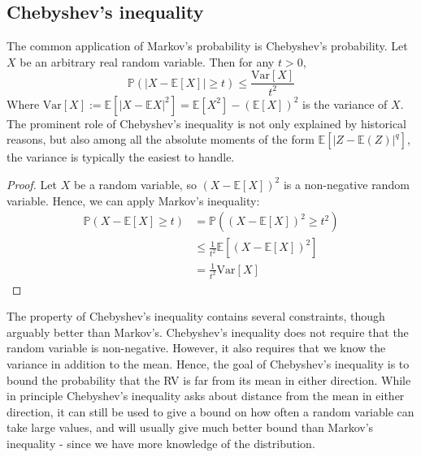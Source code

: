 \subsection{Chebyshev's inequality}
The common application of Markov's probability is Chebyshev's probability. Let $X$ be an arbitrary real random variable. Then for any $t> 0$, 
\begin{equation}
    \mathbb{P}(|X-\mathbb{E}[X]| \geq t) \leq \frac{\mathrm{Var}[X]}{t^{2}} 
\end{equation}
Where $\mathrm{Var}[X]:= \mathbb{E}[|X-\mathbb{E}X|^{2}]=\mathbb{E}[X^{2}]- (\mathbb{E}[X])^{2}$ is the variance of $X$. The prominent role of Chebyshev's inequality is not only explained by historical reasons, but also among all the absolute moments of the form $\mathbb{E}[|Z-\mathbb{E}(Z)|^{q}]$, the variance is typically the easiest to handle. 
\begin{proof}
    Let $X$ be a random variable, so $(X-\mathbb{E}[X])^{2}$ is a non-negative random variable. Hence, we can apply Markov's inequality: 
    \begin{align}
        \mathbb{P}(X-\mathbb{E}[X]\geq t) & = \mathbb{P}\left((X-\mathbb{E}[X])^{2}\geq t^{2}\right)\\
        & \leq \frac{1}{t^{2}} \mathbb{E} \left[(X-\mathbb{E}[X])^{2}\right]\\
        & = \frac{1}{t^2} \mathrm{Var}[X]
    \end{align}
\end{proof}
The property of Chebyshev's inequality contains several constraints, though arguably better than Markov's. Chebyshev's inequality does not require that the random variable is non-negative. However, it also requires that we know the variance in addition to the mean. Hence, the goal of Chebyshev's inequality is to bound the probability that the RV is far from its mean in either direction. While in principle Chebyshev's inequality asks about distance from the mean in either direction, it can still be used to give a bound on how often a random variable can take large values, and will usually give much better bound than Markov's inequality - since we have more knowledge of the distribution. 

